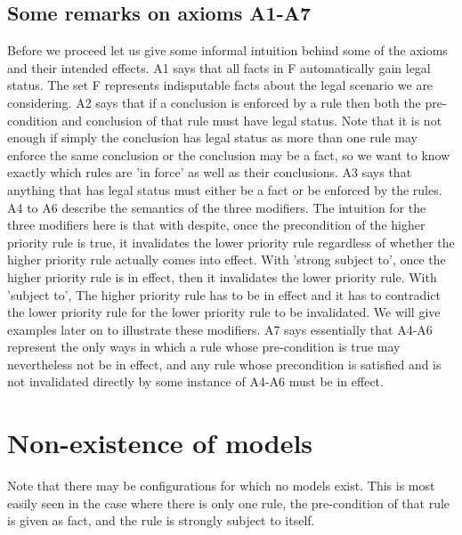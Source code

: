 \subsection{Some remarks on axioms A1-A7}
Before we proceed let us give some informal intuition behind some of the axioms and their intended effects. A1 says that all facts in F automatically gain legal status. The set F represents indisputable facts about the legal scenario we are considering. A2 says that if a conclusion is enforced by a rule then both the pre-condition and conclusion of that rule must have legal status. Note that it is not enough if simply the conclusion has legal status as more than one rule may enforce the same conclusion or the conclusion may be a fact, so we want to know exactly which rules are 'in force' as well as their conclusions. A3 says that anything that has legal status must either be a fact or be enforced by the rules. A4 to A6 describe the semantics of the three modifiers. The intuition for the three modifiers here is that with despite, once the precondition of the higher priority rule is true, it invalidates the lower priority rule regardless of whether the higher priority rule actually comes into effect. With 'strong subject to', once the higher priority rule is in effect, then it invalidates the lower priority rule. With 'subject to', The higher priority rule has to be in effect and it has to contradict the lower priority rule for the lower priority rule to be invalidated. We will give examples later on to illustrate these modifiers. A7 says essentially that A4-A6 represent the only ways in which a rule whose pre-condition is true may nevertheless not be in effect, and any rule whose precondition is satisfied and is not invalidated directly by some instance of A4-A6 must be in effect. 
\section{Non-existence of models}
Note that there may be configurations for which no models exist. This is most easily seen in the case where there is only one rule, the pre-condition of that rule is given as fact, and the rule is strongly subject to itself. 
